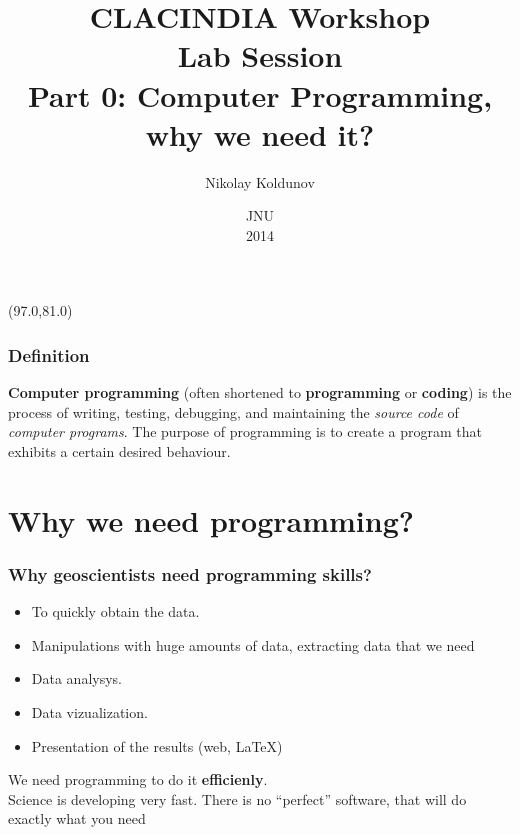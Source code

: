 \documentclass{beamer}
\title{CLACINDIA Workshop \\
Lab Session\\
       Part 0: Computer Programming, why we need it?}
\author{Nikolay Koldunov}
\date{JNU\\
       2014}
\newcommand{\blankline}{\quad\pagebreak[2]}
\newcommand{\MyLogo}{%
\begin{textblock}{14}(97.0,81.0)
  \pgfuseimage{logo}
\end{textblock}
}
\begin{document}
\begin{frame}
\titlepage
\MyLogo
\end{frame}


\begin{frame}[fragile]
\frametitle{Definition}
\textbf{Computer programming} (often shortened to \textbf{programming} or \textbf{coding}) is the process of writing, testing, debugging, and maintaining the \textit{source code} of \textit{computer programs}. The purpose of programming is to create a program that exhibits a certain desired behaviour.
\end{frame}

\section{Why we need programming?}

\begin{frame}
\frametitle{Why geoscientists need programming skills?}
\pause
\begin{itemize}
 \item To quickly obtain the data.
 \item Manipulations with huge amounts of data, extracting data that we need
 \item Data analysys. 
 \item Data vizualization.
 \item Presentation of the results (web, \LaTeX{})

\end{itemize}

\blankline

\begin{center}
We need programming to do it \textbf{efficienly}.\\
Science is developing very fast. There is no ``perfect'' software, that will do exactly what you need
\end{center}

\end{frame}

\end{document}

